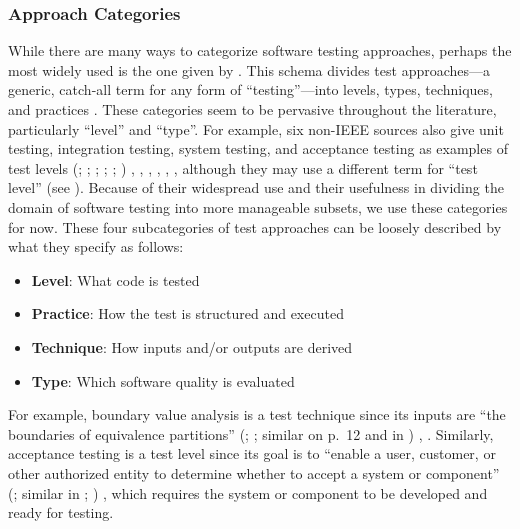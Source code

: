 \subsubsection{Approach Categories}
\label{categories-observ}

While there are many ways to categorize software testing approaches, perhaps
the most widely used is the one given by \ifnotpaper\else \citeauthor{IEEE2022}
\fi \citet{IEEE2022}. This schema divides test approaches---a generic, catch-all
term for any form of ``testing''---into levels, types, techniques, and practices
\citeyearpar[Fig.~2; see ]{IEEE2022}. These categories seem
to be pervasive throughout the literature, particularly ``level'' and ``type''.
\label{nonIEEE-sources}%
For example, six non-IEEE sources also give unit testing, integration testing,
system testing, and acceptance testing as examples of test levels \ifnotpaper
    (\citealp[pp.~5\=/6 to 5\=/7]{SWEBOK2024}; \citealpISTQB{};
    \citealp[pp.~807\==808]{Perry2006}; \citealp[pp.~443\==445]{PetersAndPedrycz2000};
    \citealp[p.~218]{KuļešovsEtAl2013};
    \citealp[pp.~9, 13]{Gerrard2000a})\else
    \cite[pp.~443\==445]{PetersAndPedrycz2000},
    \cite[pp.~5\=/6 to 5\=/7]{SWEBOK2024}, \cite{ISTQB},
    \cite[pp.~807\==808]{Perry2006}, \cite[pp.~9, 13]{Gerrard2000a},
    \cite[p.~218]{KuļešovsEtAl2013}\fi,
although they may use a different term for ``test
level'' (see ). Because of their widespread use and
their usefulness in dividing the domain of software testing into more
manageable subsets, we use these categories for now. These four subcategories
of test approaches can be loosely described by what they specify as
follows:
\begin{itemize}
    \item \textbf{Level}: What code is tested
    \item \textbf{Practice}: How the test is structured and executed
    \item \textbf{Technique}: How inputs and/or outputs are derived
    \item \textbf{Type}: Which software quality is evaluated
\end{itemize}
For example, boundary value analysis is a test technique since its inputs are
``the boundaries of equivalence partitions'' \ifnotpaper
    (\citealp[p.~2]{IEEE2022}; \citeyear[p.~1]{IEEE2021}; similar on p.~12 and
    in \citealpISTQB{})%
\else
    \cite[p.~2]{IEEE2022}, \cite[p.~1]{IEEE2021}%
\fi. Similarly, acceptance testing is a test level since its goal is to
``enable a user, customer, or other authorized entity to determine whether to
accept a system or component'' \ifnotpaper (\citealp[p.~5]{IEEE2017}; similar
    in \citeyear[p.~6]{IEEE2021}; \citealp[p.~344]{SakamotoEtAl2013})\else
    \cite[p.~5]{IEEE2017}\fi, which requires the system or component to be
developed and ready for testing.

